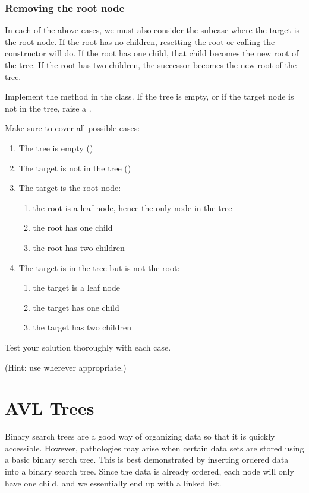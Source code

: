 \subsubsection*{Removing the root node}

In each of the above cases, we must also consider the subcase where the target is the root node.
If the root has no children, resetting the root or calling the constructor will do.
If the root has one child, that child becomes the new root of the tree.
If the root has two children, the successor becomes the new root of the tree.

\begin{problem}
Implement the  method in the  class.
If the tree is empty, or if the target node is not in the tree, raise a .

Make sure to cover all possible cases:
\begin{enumerate}
\item The tree is empty ()
\item The target is not in the tree ()
\item The target is the root node:
	\begin{enumerate}
	\item{the root is a leaf node, hence the only node in the tree}
	\item{the root has one child}
	\item{the root has two children}
	\end{enumerate}
\item The target is in the tree but is not the root:
	\begin{enumerate}
	\item{the target is a leaf node}
	\item{the target has one child}
	\item{the target has two children}
	\end{enumerate}
\end{enumerate}
Test your solution thoroughly with each case.

(Hint: use  wherever appropriate.)
\end{problem}

\section*{AVL Trees}

Binary search trees are a good way of organizing data so that it is quickly accessible.
However, pathologies may arise when certain data sets are stored using a basic binary serch tree.
This is best demonstrated by inserting ordered data into a binary search tree.
Since the data is already ordered, each node will only have one child, and we essentially end up with a linked list.


